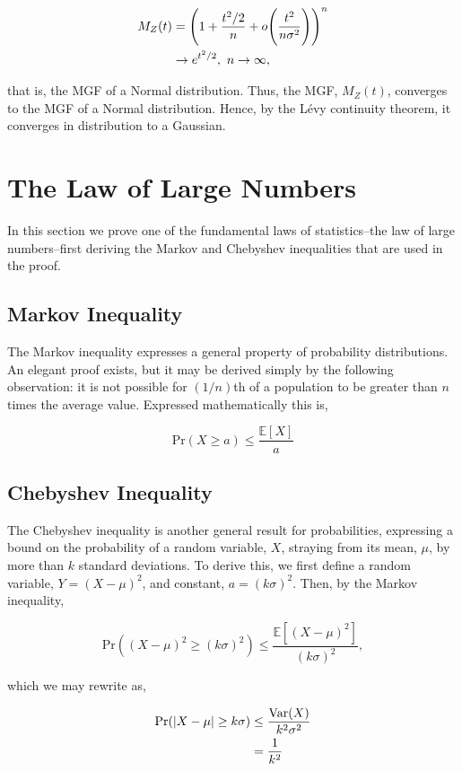 \documentclass[11pt]{amsart}
\begin{document}
\begin{align}
M_Z(t) &= \Bigg(1 + \frac{t^2/2}{n} + o\Bigg(\frac{t^2}{n\sigma^2}\Bigg)\Bigg)^n \notag \\
&\to e^{t^2/2}, \ n \to \infty, \notag
\end{align}

that is, the MGF of a Normal distribution. Thus, the MGF, $M_Z(t)$, converges to the MGF of a Normal distribution. Hence, by the L\'evy continuity theorem, it converges in distribution to a Gaussian.

\section{The Law of Large Numbers}

In this section we prove one of the fundamental laws of statistics--the law of large numbers--first deriving the Markov and Chebyshev inequalities that are used in the proof.

\subsection{Markov Inequality}

The Markov inequality expresses a general property of probability distributions. An elegant proof exists, but it may be derived simply by the following observation: it is not possible for $(1/n)$th of a population to be greater than $n$ times the average value. Expressed mathematically this is,

$$\text{Pr}(X \geq a) \leq \frac{\mathbb{E}[X]}{a}$$

\subsection{Chebyshev Inequality}

The Chebyshev inequality is another general result for probabilities, expressing a bound on the probability of a random variable, $X$, straying from its mean, $\mu$, by more than $k$ standard deviations. To derive this, we first define a random variable, $Y = (X - \mu)^2$, and constant, $a = (k\sigma)^2$. Then, by the Markov inequality,

$$\text{Pr}((X - \mu)^2 \geq (k\sigma)^2) \leq \frac{\mathbb{E}[(X - \mu)^2]}{(k\sigma)^2},$$

which we may rewrite as,

\begin{align}
\text{Pr}(|X - \mu| \geq k\sigma) &\leq \frac{\text{Var}(X)}{k^2\sigma^2} \notag \\
&= \frac{1}{k^2} \notag
\end{align}
\end{document}
